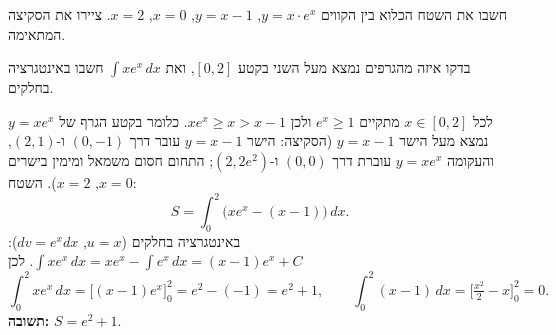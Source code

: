 
\begin{question}
חשבו את השטח הכלוא בין הקווים $y=x\cdot e^x$, $y=x-1$, $x=0$, $x=2$. ציירו את הסקיצה המתאימה.
\end{question}

\begin{hint}
בדקו איזה מהגרפים נמצא מעל השני בקטע $[0,2]$, ואת $\int xe^x\,dx$ חשבו באינטגרציה בחלקים.
\end{hint}

\begin{solution}
לכל $x\in[0,2]$ מתקיים $e^x\ge1$ ולכן $xe^x\ge x>x-1$. כלומר בקטע הגרף של $y=xe^x$ נמצא מעל הישר $y=x-1$ (הסקיצה: הישר $y=x-1$ עובר דרך $(0,-1)$ ו-$(2,1)$, והעקומה $y=xe^x$ עוברת דרך $(0,0)$ ו-$(2,2e^2)$; התחום חסום משמאל ומימין בישרים $x=0$, $x=2$). השטח:
\[ S=\int_0^2\big(xe^x-(x-1)\big)\,dx. \]
באינטגרציה בחלקים ($u=x$, $dv=e^xdx$): $\int xe^x\,dx=xe^x-\int e^x\,dx=(x-1)e^x+C$. לכן
\[ \int_0^2 xe^x\,dx=\big[(x-1)e^x\big]_0^2=e^2-(-1)=e^2+1, \qquad \int_0^2(x-1)\,dx=\Big[\tfrac{x^2}{2}-x\Big]_0^2=0. \]
\textbf{תשובה:} $S=e^2+1$.
\end{solution}
